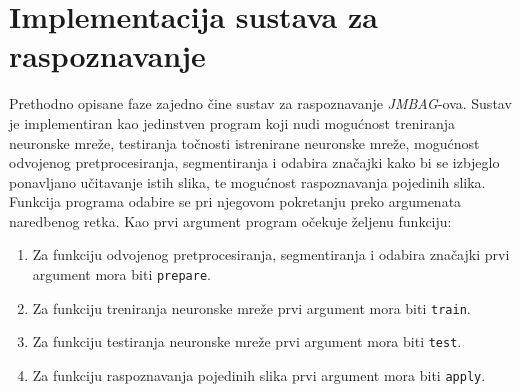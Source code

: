\section{Implementacija sustava za raspoznavanje}
\label{sec:implementacija-sustava-za-raspoznavanje}
Prethodno opisane faze zajedno čine sustav za raspoznavanje \emph{JMBAG}-ova. Sustav je implementiran kao jedinstven
program koji nudi mogućnost treniranja neuronske mreže, testiranja točnosti istrenirane neuronske mreže, mogućnost
odvojenog pretprocesiranja, segmentiranja i odabira značajki kako bi se izbjeglo ponavljano učitavanje istih slika, te
mogućnost raspoznavanja pojedinih slika. Funkcija programa odabire se pri njegovom pokretanju preko argumenata
naredbenog retka. Kao prvi argument program očekuje željenu funkciju:
\begin{enumerate}
    \item Za funkciju odvojenog pretprocesiranja, segmentiranja i odabira značajki prvi argument mora biti
    \texttt{prepare}.
    \item Za funkciju treniranja neuronske mreže prvi argument mora biti \texttt{train}.
    \item Za funkciju testiranja neuronske mreže prvi argument mora biti \texttt{test}.
    \item Za funkciju raspoznavanja pojedinih slika prvi argument mora biti \texttt{apply}.
\end{enumerate}


